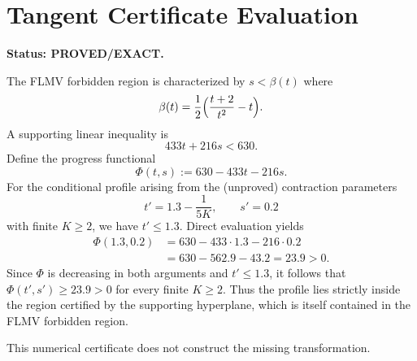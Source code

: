 \documentclass{article}
\begin{document}
\section*{Tangent Certificate Evaluation}
\textbf{Status: PROVED/EXACT.}

The FLMV forbidden region is characterized by \(s < \beta(t)\) where
\[
\beta(t) = \frac12\Bigl(\frac{t+2}{t^2}-t\Bigr).
\]
A supporting linear inequality is
\[
433t + 216s < 630.
\]
Define the progress functional
\[
\Phi(t,s) := 630 - 433t - 216s.
\]
For the conditional profile arising from the (unproved) contraction parameters
\[
t' = 1.3 - \frac{1}{5K}, \qquad s' = 0.2
\]
with finite \(K \ge 2\), we have \(t' \le 1.3\). Direct evaluation yields
\begin{align*}
\Phi(1.3, 0.2) &= 630 - 433\cdot 1.3 - 216\cdot 0.2 \\
&= 630 - 562.9 - 43.2 = 23.9 > 0.
\end{align*}
Since \(\Phi\) is decreasing in both arguments and \(t' \le 1.3\), it follows that \(\Phi(t', s') \ge 23.9 > 0\) for every finite \(K \ge 2\). Thus the profile lies strictly inside the region certified by the supporting hyperplane, which is itself contained in the FLMV forbidden region.

This numerical certificate does not construct the missing transformation.
\end{document}
